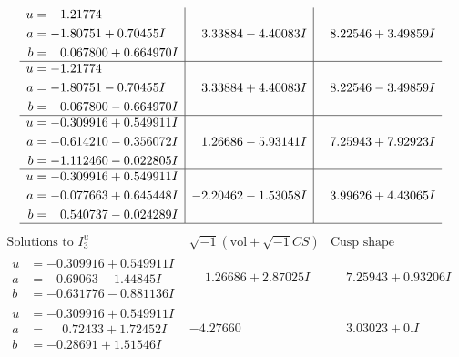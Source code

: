 \documentclass[1p]{elsarticle_modified}
\theoremstyle{definition}
\newcommand{\I}{\sqrt{-1}}
\begin{document}
$$\begin{array}{c|c|c}
\begin{aligned}
u &= -1.21774\phantom{ +0.000000I} \\
a &= -1.80751 + 0.70455 I \\
b &= \phantom{-}0.067800 + 0.664970 I\end{aligned}
 & \phantom{-}3.33884 - 4.40083 I & \phantom{-}8.22546 + 3.49859 I \\ \hline\begin{aligned}
u &= -1.21774\phantom{ +0.000000I} \\
a &= -1.80751 - 0.70455 I \\
b &= \phantom{-}0.067800 - 0.664970 I\end{aligned}
 & \phantom{-}3.33884 + 4.40083 I & \phantom{-}8.22546 - 3.49859 I \\ \hline\begin{aligned}
u &= -0.309916 + 0.549911 I \\
a &= -0.614210 - 0.356072 I \\
b &= -1.112460 - 0.022805 I\end{aligned}
 & \phantom{-}1.26686 - 5.93141 I & \phantom{-}7.25943 + 7.92923 I \\ \hline\begin{aligned}
u &= -0.309916 + 0.549911 I \\
a &= -0.077663 + 0.645448 I \\
b &= \phantom{-}0.540737 - 0.024289 I\end{aligned}
 & -2.20462 - 1.53058 I & \phantom{-}3.99626 + 4.43065 I\\
 \hline 
 \end{array}$$\newpage$$\begin{array}{c|c|c}  
\text{Solutions to }I^u_{3}& \I (\text{vol} + \sqrt{-1}CS) & \text{Cusp shape}\\
 \hline 
\begin{aligned}
u &= -0.309916 + 0.549911 I \\
a &= -0.69063 - 1.44845 I \\
b &= -0.631776 - 0.881136 I\end{aligned}
 & \phantom{-}1.26686 + 2.87025 I & \phantom{-}7.25943 + 0.93206 I \\ \hline\begin{aligned}
u &= -0.309916 + 0.549911 I \\
a &= \phantom{-}0.72433 + 1.72452 I \\
b &= -0.28691 + 1.51546 I\end{aligned}
 & -4.27660\phantom{ +0.000000I} & \phantom{-}3.03023 + 0. I\phantom{ +0.000000I} \\ \hline\begin{aligned}

\end{aligned}
\end{array}$$
\end{document}
